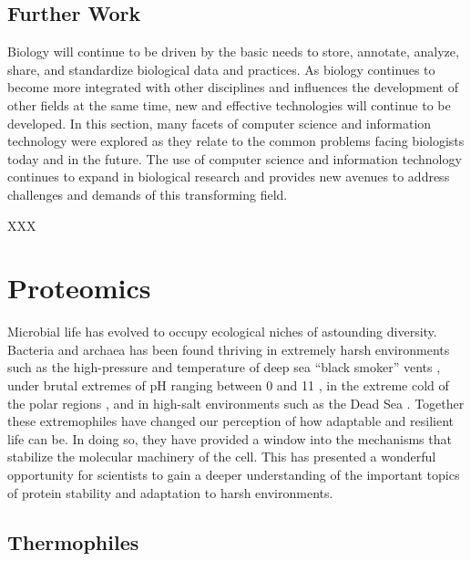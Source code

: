 {\subsection{Further Work}

Biology will continue to be driven by the basic needs to store, annotate,
analyze, share, and standardize biological data and practices. As biology
continues to become more integrated with other disciplines and influences the
development of other fields at the same time, new and effective technologies
will continue to be developed. In this section, many facets of computer science
and information technology were explored as they relate to the common problems
facing biologists today and in the future.  The use of computer science and
information technology continues to expand in biological research and provides
new avenues to address challenges and demands of this transforming field.



XXX
\section{Proteomics}

Microbial life has evolved to occupy ecological niches of astounding diversity.
Bacteria and archaea has been found thriving in extremely harsh environments
such as the high-pressure and temperature of deep sea ``black smoker'' vents
\cite{blochl1997pfg}, under brutal extremes of pH ranging between 0 and 11
\cite{2,4}, in the extreme cold of the polar regions \cite{6,7}, and in
high-salt environments such as the Dead Sea \cite{5}.  Together these
extremophiles have changed our perception of how adaptable and resilient life
can be. In doing so, they have provided a window into the mechanisms that
stabilize the molecular machinery of the cell. This has presented a wonderful
opportunity for scientists to gain a deeper understanding of the important
topics of protein stability and adaptation to harsh environments.

\subsection{Thermophiles}

}
